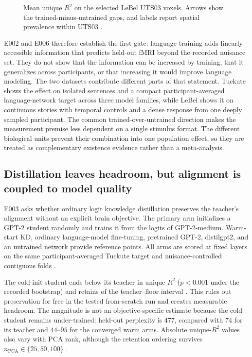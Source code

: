\begin{figure}[H]
  \centering
  \resizebox{0.82\textwidth}{!}{}
  \caption{Mean unique $R^2$ on the selected LeBel UTS03 voxels. Arrows show the trained-minus-untrained gaps, and labels report spatial prevalence within UTS03 .}
  \label{fig:a2}
\end{figure}

E002 and E006 therefore establish the first gate: language training adds linearly accessible information that predicts held-out fMRI beyond the recorded nuisance set.
They do not show that the information can be increased by training, that it generalizes across participants, or that increasing it would improve language modeling.
The two datasets contribute different parts of that statement.
Tuckute shows the effect on isolated sentences and a compact participant-averaged language-network target across three model families, while LeBel shows it on continuous stories with temporal controls and a dense response from one deeply sampled participant.
The common trained-over-untrained direction makes the measurement premise less dependent on a single stimulus format.
The different biological units prevent their combination into one population effect, so they are treated as complementary existence evidence rather than a meta-analysis.

\subsection{Distillation leaves headroom, but alignment is coupled to model quality}
\label{sec:results-preservation}

E003 asks whether ordinary logit knowledge distillation preserves the teacher's alignment without an explicit brain objective.
The primary arm initializes a GPT-2 student randomly and trains it from the logits of GPT-2-medium.
Warm-start KD, ordinary language-model fine-tuning, pretrained GPT-2, distilgpt2, and an untrained network provide reference points.
All arms are scored at fixed layers on the same participant-averaged Tuckute target and nuisance-controlled contiguous folds .

The cold-init student ends  below its teacher in unique $R^2$ ($p<0.001$ under the recorded bootstrap) and retains  of the teacher--floor interval .
This rules out preservation for free in the tested from-scratch run and creates measurable headroom.
The magnitude is not an objective-specific estimate because the cold student remains under-trained: held-out perplexity is $477$, compared with $74$ for its teacher and $44$--$95$ for the converged warm arms.
Absolute unique-$R^2$ values also vary with PCA rank, although the retention ordering survives $n_{\mathrm{PCA}}\in\{25,50,100\}$ .

